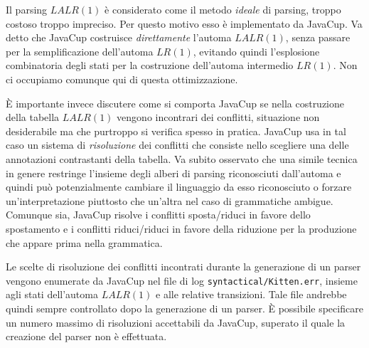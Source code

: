 Il parsing $\mathit{LALR}(1)$ \`e considerato come il metodo \emph{ideale} di
parsing, \nec troppo costoso \nec troppo impreciso. Per questo motivo esso
\`e implementato da JavaCup. Va detto che JavaCup costruisce
\emph{direttamente}
l'automa $\mathit{LALR}(1)$, senza passare per la semplificazione dell'automa
$\mathit{LR}(1)$, evitando quindi l'esplosione combinatoria degli stati per la
costruzione dell'automa intermedio $\mathit{LR}(1)$.
Non ci occupiamo comunque qui di questa ottimizzazione.

\`E importante invece discutere come si comporta JavaCup se nella
costruzione della tabella $\mathit{LALR}(1)$ vengono incontrari dei
conflitti, situazione non desiderabile ma che purtroppo si verifica
spesso in pratica. JavaCup usa in tal caso un sistema di \emph{risoluzione}
dei conflitti che consiste nello scegliere una delle annotazioni contrastanti
della tabella. Va subito osservato che una simile tecnica
in genere restringe l'insieme
degli alberi di parsing riconosciuti dall'automa e quindi pu\`o potenzialmente
cambiare il linguaggio da esso riconosciuto o forzare un'interpretazione
piuttosto che un'altra nel caso di grammatiche ambigue. Comunque sia,
JavaCup risolve i conflitti sposta/riduci in favore dello spostamento e i
conflitti riduci/riduci in favore della riduzione per la produzione che
appare prima nella grammatica.

Le scelte di risoluzione dei conflitti incontrati durante la generazione
di un parser vengono enumerate da JavaCup
nel file di log \texttt{syntactical/Kitten.err}, insieme agli stati dell'automa
$\mathit{LALR}(1)$ e alle relative transizioni. Tale file andrebbe quindi
sempre controllato dopo la generazione di un parser. \`E possibile specificare
un numero massimo di risoluzioni accettabili da JavaCup, superato il quale
la creazione del parser non \`e effettuata.
%
